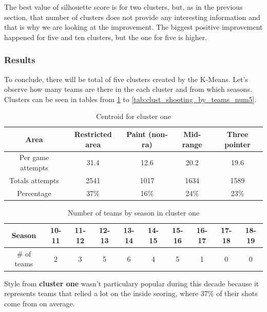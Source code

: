 \documentclass[a4paper]{article}
\begin{document}
The best value of silhouette score is for two clusters, but, as in the previous section, that number of clusters does not provide any interesting information and that is why we are looking at the improvement. The biggest positive improvement happened for five and ten clusters, but the one for five is higher.

\subsubsection{Results}
\label{subsubsec:clust_shooting_by_teams_results}

To conclude, there will be total of five clusters created by the K-Means.  Let's observe how many teams are there in the each cluster and from which seasons. Clusters can be seen in tables from \ref{tab:clust_shooting_by_teams_centr1} to \ref{tab:clust_shooting_by_teams_num5}.

\begin{table}[!h]
\begin{center}
\begin{tabular}{|c|c|c|c|c|} \hline
Area & Restricted area & Paint (non-ra) & Mid-range & Three pointer \\ \hline
Per game attempts & 31.4 & 12.6 & 20.2 & 19.6  \\ \hline
Totals attempts & 2541 & 1017 & 1634 & 1589  \\ \hline
Percentage & 37\% & 16\% & 24\% & 23\% \\ \hline
\end{tabular}
\caption{Centroid for cluster one}
\label{tab:clust_shooting_by_teams_centr1}
\end{center}
\end{table}

\begin{table}[!h]
\begin{tabular}{|c|c|c|c|c|c|c|c|c|c|} \hline
Season & 10-11 & 11-12 & 12-13 & 13-14 & 14-15 & 15-16 & 16-17 & 17-18 & 18-19 \\ \hline
\# of teams & 2 & 3 & 5 & 6 & 4 & 5 & 1 & 0 & 0 \\ \hline
\end{tabular}
\caption{Number of teams by season in cluster one}
\label{tab:clust_shooting_by_teams_num1}
\end{table}

Style from \textbf{cluster one} wasn't particulary popular during this decade because it represents teams that relied a lot on the inside scoring, where 37\% of their shots come from on average. 
\end{document}
